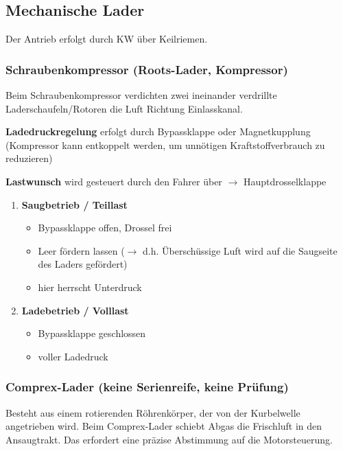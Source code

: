 \subsection{Mechanische Lader}\label{mechanische-lader}

Der Antrieb erfolgt durch KW über Keilriemen.

\subsubsection{Schraubenkompressor (Roots-Lader,
Kompressor)}\label{schraubenkompressor-roots-lader-kompressor}

Beim Schraubenkompressor verdichten zwei ineinander verdrillte
Laderschaufeln/Rotoren die Luft Richtung Einlasskanal.

\textbf{Ladedruckregelung} erfolgt durch Bypassklappe oder
Magnetkupplung (Kompressor kann entkoppelt werden, um unnötigen
Kraftstoffverbrauch zu reduzieren)

\textbf{Lastwunsch} wird gesteuert durch den Fahrer über $\to$
Hauptdrosselklappe

\begin{enumerate}
\item
  \textbf{Saugbetrieb / Teillast}

  \begin{itemize}
  \item
    Bypassklappe offen, Drossel frei
  \item
    Leer fördern lassen ($\to$ d.h. Überschüssige Luft wird auf die
    Saugseite des Laders gefördert)
  \item
    hier herrscht Unterdruck
  \end{itemize}
\item
  \textbf{Ladebetrieb / Volllast}

  \begin{itemize}
  \item
    Bypassklappe geschlossen
  \item
    voller Ladedruck
  \end{itemize}
\end{enumerate}

\subsubsection{Comprex-Lader (keine Serienreife, keine
Prüfung)}\label{comprex-lader-keine-serienreife-keine-pruefung}

Besteht aus einem rotierenden Röhrenkörper, der von der Kurbelwelle
angetrieben wird. Beim Comprex-Lader schiebt Abgas die Frischluft in den
Ansaugtrakt. Das erfordert eine präzise Abstimmung auf die
Motorsteuerung.

